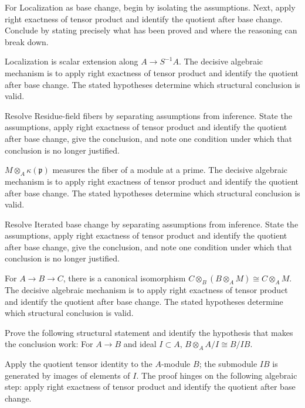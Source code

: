\begin{problem}\label{prob:v11-problem-06}
For Localization as base change, begin by isolating the assumptions. Next, apply right exactness of tensor product and identify the quotient after base change. Conclude by stating precisely what has been proved and where the reasoning can break down.
\end{problem}
\begin{solution}
Localization is scalar extension along $A\to S^{-1}A$. The decisive algebraic mechanism is to apply right exactness of tensor product and identify the quotient after base change. The stated hypotheses determine which structural conclusion is valid.
\end{solution}

\begin{problem}\label{prob:v11-problem-07}
Resolve Residue-field fibers by separating assumptions from inference. State the assumptions, apply right exactness of tensor product and identify the quotient after base change, give the conclusion, and note one condition under which that conclusion is no longer justified.
\end{problem}
\begin{solution}
$M\otimes_A\kappa(\mathfrak p)$ measures the fiber of a module at a prime. The decisive algebraic mechanism is to apply right exactness of tensor product and identify the quotient after base change. The stated hypotheses determine which structural conclusion is valid.
\end{solution}

\begin{problem}\label{prob:v11-problem-08}
Resolve Iterated base change by separating assumptions from inference. State the assumptions, apply right exactness of tensor product and identify the quotient after base change, give the conclusion, and note one condition under which that conclusion is no longer justified.
\end{problem}
\begin{solution}
For $A\to B\to C$, there is a canonical isomorphism $C\otimes_B(B\otimes_A M)\cong C\otimes_A M$. The decisive algebraic mechanism is to apply right exactness of tensor product and identify the quotient after base change. The stated hypotheses determine which structural conclusion is valid.
\end{solution}

\begin{problem}\label{prob:v11-problem-09}
Prove the following structural statement and identify the hypothesis that makes the conclusion work: For $A\to B$ and ideal $I\subset A$, $B\otimes_A A/I\cong B/IB$.
\end{problem}
\begin{solution}
Apply the quotient tensor identity to the $A$-module $B$; the submodule $IB$ is generated by images of elements of $I$. The proof hinges on the following algebraic step: apply right exactness of tensor product and identify the quotient after base change.
\end{solution}

